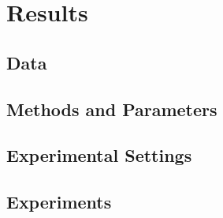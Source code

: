 \chapter{Results} \label{chap:experiments}

\section{Data}
\section{Methods and Parameters}
\section{Experimental Settings}
\section{Experiments}